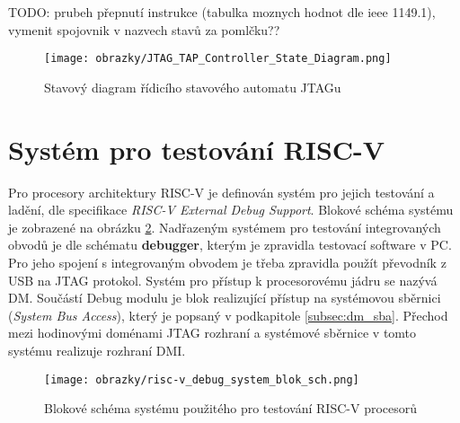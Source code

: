 TODO: prubeh přepnutí instrukce (tabulka moznych hodnot dle ieee 1149.1), vymenit spojovnik v nazvech stavů za pomlčku??

\begin{figure}[H]
  \begin{center}
    \texttt{[image: obrazky/JTAG\_TAP\_Controller\_State\_Diagram.png]}
  \end{center}
  \caption{Stavový diagram řídicího stavového automatu JTAGu \cite{JTAG_TAP_diagram}}
	\label{fig:tap_controller}
\end{figure}





\section{Systém pro testování \acs{RISC-V}}		\label{sec:risc-v_dbg}
Pro procesory architektury \acs{RISC-V} je definován systém pro jejich testování a ladění, dle specifikace \textit{RISC-V External Debug Support}. Blokové schéma systému je zobrazené na obrázku \ref{fig:blok_sch_risc-v_dbg}. Nadřazeným systémem pro testování integrovaných obvodů je dle schématu \textbf{debugger}, kterým je zpravidla testovací software v PC. Pro jeho spojení s integrovaným obvodem je třeba zpravidla použít převodník z USB na JTAG protokol. Systém pro přístup k procesorovému jádru se nazývá \ac{DM}. Součástí Debug modulu je blok realizující přístup na systémovou sběrnici (\textit{System Bus Access}), který je popsaný v podkapitole \ref{subsec:dm_sba}. Přechod mezi hodinovými doménami \acs{JTAG} rozhraní a systémové sběrnice v tomto systému realizuje rozhraní \ac{DMI}. \cite{risc-v_dbg}


\begin{figure}[!h]
  \begin{center}
    \texttt{[image: obrazky/risc-v\_debug\_system\_blok\_sch.png]}
  \end{center}
  \caption{Blokové schéma systému použitého pro testování \acs{RISC-V} procesorů \cite{risc-v_dbg}}
	\label{fig:blok_sch_risc-v_dbg}
\end{figure}

